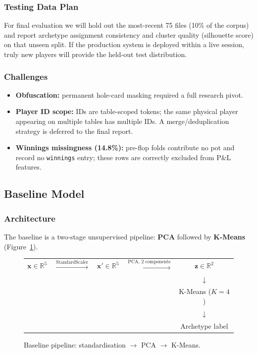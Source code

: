 \documentclass{article}
\begin{document}
\subsubsection{Testing Data Plan}
For final evaluation we will hold out the most-recent 75 files (10\% of the corpus) and
report archetype assignment consistency and cluster quality (silhouette score) on that
unseen split. If the production system is deployed within a live session, truly new players
will provide the held-out test distribution.

\subsubsection{Challenges}
\begin{itemize}[noitemsep]
  \item \textbf{Obfuscation:} permanent hole-card masking required a full research pivot.
  \item \textbf{Player ID scope:} IDs are table-scoped tokens; the same physical player
        appearing on multiple tables has multiple IDs. A merge/deduplication strategy
        is deferred to the final report.
  \item \textbf{Winnings missingness (14.8\%):} pre-flop folds contribute no pot and
        record no \texttt{winnings} entry; these rows are correctly excluded from P\&L
        features.
\end{itemize}

\subsection{Baseline Model}

\subsubsection{Architecture}
The baseline is a two-stage unsupervised pipeline: \textbf{PCA} followed by
\textbf{K-Means} (Figure~\ref{fig:baseline}).

\begin{figure}[H]
\centering
\begin{tabular}{ccccc}
$\mathbf{x} \in \mathbb{R}^5$ &
$\xrightarrow{\text{StandardScaler}}$ &
$\mathbf{x}' \in \mathbb{R}^5$ &
$\xrightarrow{\text{PCA, 2 components}}$ &
$\mathbf{z} \in \mathbb{R}^2$ \\
& & & & $\downarrow$ \\
& & & & K-Means ($K=4$) \\
& & & & $\downarrow$ \\
& & & & Archetype label
\end{tabular}
\caption{Baseline pipeline: standardisation $\to$ PCA $\to$ K-Means.}
\label{fig:baseline}
\end{figure}
\end{document}
